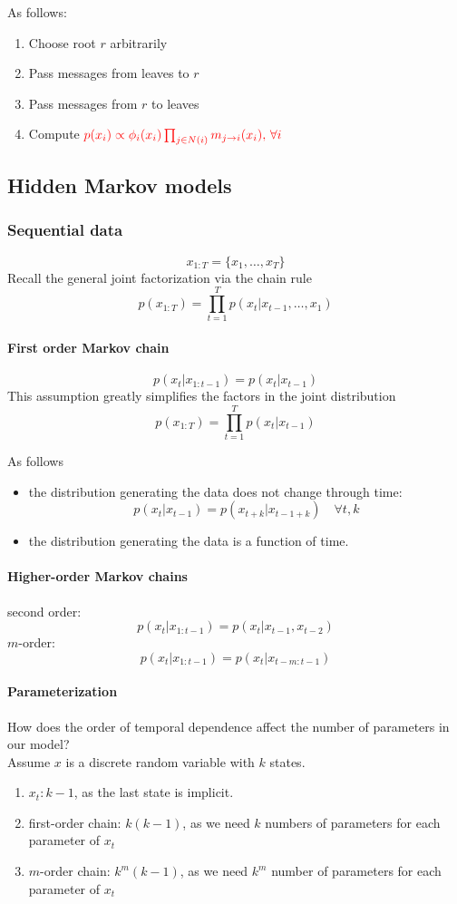 \documentclass[11pt]{article}
\begin{document}
As follows:
\begin{enumerate}
	\item Choose root $r$ arbitrarily
	\item Pass messages from leaves to $r$
	\item Pass messages from $r$ to leaves
	\item Compute $\textcolor{red}{p(x_i) \propto \phi_i(x_i) \prod_{j \in N(i)} m_{j \rightarrow i}(x_i), \, \forall i}$
\end{enumerate}

\subsection{Hidden Markov models}
\subsubsection{Sequential data}
$$x_{1:T} = \{x_1, \hdots, x_T\}$$
Recall the general joint factorization via the chain rule
$$p(x_{1:T}) = \prod_{t=1}^T p(x_t|x_{t-1}, \hdots, x_1)$$
\paragraph{First order Markov chain}
$$p(x_t | x_{1:t-1}) = p(x_t | x_{t-1})$$
This assumption greatly simplifies the factors in the joint distribution
$$p(x_{1:T}) = \prod_{t=1}^T p(x_t|x_{t-1})$$

As follows
\begin{itemize}
	\item {}the distribution generating the data does not change through time:
	$$p(x_t|x_{t-1}) = p(x_{t+k}|x_{t-1+k})\quad \forall t, k$$
	\item {}the distribution generating the data is a function of time.
\end{itemize}

\paragraph{Higher-order Markov chains}
second order:
$$p(x_t|x_{1:t-1}) = p(x_t|x_{t-1},x_{t-2})$$
$m$-order:
$$p(x_t|x_{1:t-1}) = p(x_t|x_{t-m:t-1})$$
\paragraph{Parameterization}
How does the order of temporal dependence affect the number of parameters in our model?\\
Assume $x$ is a discrete random variable with $k$ states. 
\begin{enumerate}
	\item $x_t: k - 1$, as the last state is implicit.
	\item first-order chain: $k(k-1)$, as we need $k$ numbers of parameters for each parameter of $x_t$
	\item $m$-order chain: $k^m(k-1)$, as we need $k^m$ number of parameters for each parameter of $x_t$
\end{enumerate}
\end{document}
